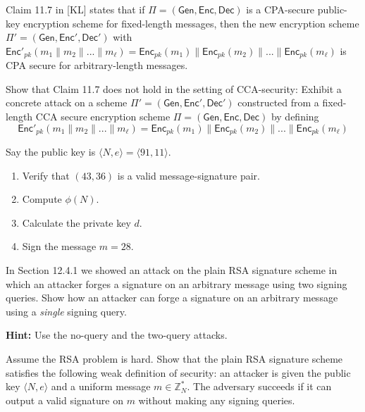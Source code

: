 \documentclass[a4paper,10pt,landscape,twocolumn]{scrartcl}
\begin{document}
	
\begin{exercise}
Claim 11.7 in [KL] states that if $\Pi=(\mathsf{Gen},\mathsf{Enc}, \mathsf{Dec})$ is a CPA-secure public-key encryption scheme for fixed-length messages, then the new encryption scheme $\Pi'=(\mathsf{Gen},\mathsf{Enc}', \mathsf{Dec}')$ with  $\mathsf{Enc}'_{pk}(m_1\|m_2\|...\|m_\ell)=\mathsf{Enc}_{pk}(m_1)\|\mathsf{Enc}_{pk}(m_2)\|...\|\mathsf{Enc}_{pk}(m_\ell)$ is CPA secure for arbitrary-length messages.

	Show that Claim 11.7 does not hold in the setting of CCA-security: Exhibit a concrete attack on a scheme $\Pi'=(\mathsf{Gen},\mathsf{Enc}', \mathsf{Dec}')$ constructed from a fixed-length CCA secure encryption scheme $\Pi=(\mathsf{Gen},\mathsf{Enc}, \mathsf{Dec})$ by defining 
\[ \mathsf{Enc}'_{pk}(m_1\|m_2\|...\|m_\ell)=\mathsf{Enc}_{pk}(m_1)\|\mathsf{Enc}_{pk}(m_2)\|...\|\mathsf{Enc}_{pk}(m_\ell) \]
\end{exercise}









\begin{exercise}
\begin{subex}
Say the public key is $\langle N,e \rangle=\langle 91,11\rangle$.
\begin{enumerate}
\item Verify that $(43,36)$ is a valid message-signature pair.
\item Compute $\phi(N)$.
\item Calculate the private key $d$.
\item Sign the message $m=28$.
\end{enumerate}
\end{subex}

\begin{subex}

In Section 12.4.1 we showed an attack on the
plain RSA signature scheme in which an attacker forges a signature
on an arbitrary message using two signing queries. Show how an
attacker can forge a signature on an arbitrary message using a
\emph{single} signing query.

\textbf{Hint:} Use the no-query and the two-query attacks. 
\end{subex}

\begin{subex}
Assume the RSA problem is hard. Show that the plain RSA signature scheme satisfies the following weak definition of security: an attacker is given the public key $\langle N, e\rangle$ and a uniform message $m \in \mathbb{Z}^*_N$. The adversary succeeds if it can output a valid signature on $m$ without making any signing queries.
\end{subex}
\end{exercise}
\end{document}
